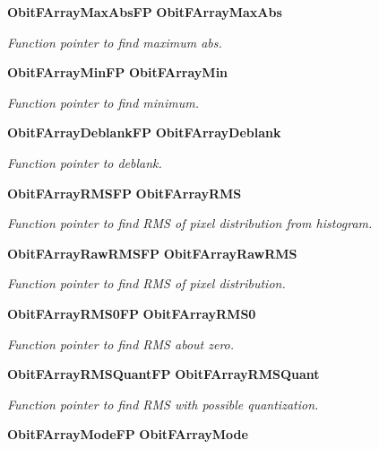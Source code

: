 \begin{CompactItemize}
{\bf Obit\-FArray\-Max\-Abs\-FP} {\bf Obit\-FArray\-Max\-Abs}
\begin{CompactList}\small\item\em Function pointer to find maximum abs. \item\end{CompactList}\item 
{\bf Obit\-FArray\-Min\-FP} {\bf Obit\-FArray\-Min}
\begin{CompactList}\small\item\em Function pointer to find minimum. \item\end{CompactList}\item 
{\bf Obit\-FArray\-Deblank\-FP} {\bf Obit\-FArray\-Deblank}
\begin{CompactList}\small\item\em Function pointer to deblank. \item\end{CompactList}\item 
{\bf Obit\-FArray\-RMSFP} {\bf Obit\-FArray\-RMS}
\begin{CompactList}\small\item\em Function pointer to find RMS of pixel distribution from histogram. \item\end{CompactList}\item 
{\bf Obit\-FArray\-Raw\-RMSFP} {\bf Obit\-FArray\-Raw\-RMS}
\begin{CompactList}\small\item\em Function pointer to find RMS of pixel distribution. \item\end{CompactList}\item 
{\bf Obit\-FArray\-RMS0FP} {\bf Obit\-FArray\-RMS0}
\begin{CompactList}\small\item\em Function pointer to find RMS about zero. \item\end{CompactList}\item 
{\bf Obit\-FArray\-RMSQuant\-FP} {\bf Obit\-FArray\-RMSQuant}
\begin{CompactList}\small\item\em Function pointer to find RMS with possible quantization. \item\end{CompactList}\item 
{\bf Obit\-FArray\-Mode\-FP} {\bf Obit\-FArray\-Mode}

\end{CompactItemize}
